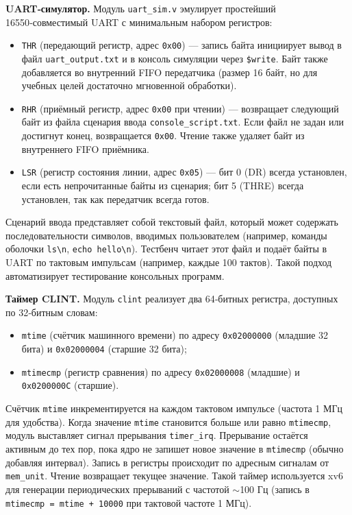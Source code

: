 \textbf{UART‑симулятор.} Модуль \texttt{uart\_sim.v} эмулирует простейший 16550‑совместимый UART с минимальным набором регистров:
\begin{itemize}
  \item \texttt{THR} (передающий регистр, адрес \texttt{0x00}) — запись байта инициирует вывод в файл \texttt{uart\_output.txt} и в консоль симуляции через \texttt{\$write}. Байт также добавляется во внутренний FIFO передатчика (размер 16 байт, но для учебных целей достаточно мгновенной обработки).
  \item \texttt{RHR} (приёмный регистр, адрес \texttt{0x00} при чтении) — возвращает следующий байт из файла сценария ввода \texttt{console\_script.txt}. Если файл не задан или достигнут конец, возвращается \texttt{0x00}. Чтение также удаляет байт из внутреннего FIFO приёмника.
  \item \texttt{LSR} (регистр состояния линии, адрес \texttt{0x05}) — бит 0 (DR) всегда установлен, если есть непрочитанные байты из сценария; бит 5 (THRE) всегда установлен, так как передатчик всегда готов.
\end{itemize}
Сценарий ввода представляет собой текстовый файл, который может содержать последовательности символов, вводимых пользователем (например, команды оболочки \texttt{ls\textbackslash n}, \texttt{echo hello\textbackslash n}). Тестбенч читает этот файл и подаёт байты в UART по тактовым импульсам (например, каждые 100 тактов). Такой подход автоматизирует тестирование консольных программ.

\textbf{Таймер CLINT.} Модуль \texttt{clint} реализует два 64‑битных регистра, доступных по 32‑битным словам:
\begin{itemize}
  \item \texttt{mtime} (счётчик машинного времени) по адресу \texttt{0x02000000} (младшие 32 бита) и \texttt{0x02000004} (старшие 32 бита);
  \item \texttt{mtimecmp} (регистр сравнения) по адресу \texttt{0x02000008} (младшие) и \texttt{0x0200000C} (старшие).
\end{itemize}
Счётчик \texttt{mtime} инкрементируется на каждом тактовом импульсе (частота 1 МГц для удобства). Когда значение \texttt{mtime} становится больше или равно \texttt{mtimecmp}, модуль выставляет сигнал прерывания \texttt{timer\_irq}. Прерывание остаётся активным до тех пор, пока ядро не запишет новое значение в \texttt{mtimecmp} (обычно добавляя интервал). Запись в регистры происходит по адресным сигналам от \texttt{mem\_unit}. Чтение возвращает текущее значение. Такой таймер используется xv6 для генерации периодических прерываний с частотой \(\sim\)100 Гц (запись в \texttt{mtimecmp = mtime + 10000} при тактовой частоте 1 МГц).

